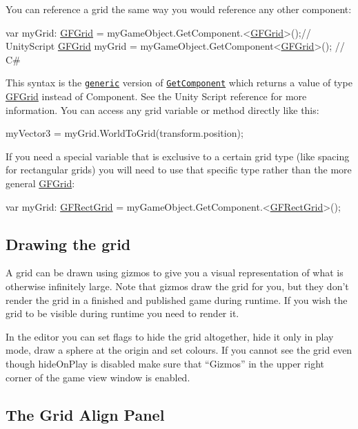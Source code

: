 You can reference a grid the same way you would reference any other component\+: 
\begin{DoxyCode}
var myGrid: \hyperlink{class_g_f_grid}{GFGrid} = myGameObject.GetComponent.<\hyperlink{class_g_f_grid}{GFGrid}>();\textcolor{comment}{// UnityScript}
\hyperlink{class_g_f_grid}{GFGrid} myGrid = myGameObject.GetComponent<\hyperlink{class_g_f_grid}{GFGrid}>();      \textcolor{comment}{// C#}
\end{DoxyCode}
 This syntax is the \href{http://docs.unity3d.com/Documentation/Manual/GenericFunctions.html}{\tt generic} version of \href{http://docs.unity3d.com/Documentation/ScriptReference/GameObject.GetComponent.html}{\tt Get\+Component} which returns a value of type \hyperlink{class_g_f_grid}{G\+F\+Grid} instead of Component. See the Unity Script reference for more information. You can access any grid variable or method directly like this\+: 
\begin{DoxyCode}
myVector3 = myGrid.WorldToGrid(transform.position);
\end{DoxyCode}
 If you need a special variable that is exclusive to a certain grid type (like {\ttfamily spacing} for rectangular grids) you will need to use that specific type rather than the more general {\ttfamily \hyperlink{class_g_f_grid}{G\+F\+Grid}}\+: 
\begin{DoxyCode}
var myGrid: \hyperlink{class_g_f_rect_grid}{GFRectGrid} = myGameObject.GetComponent.<\hyperlink{class_g_f_rect_grid}{GFRectGrid}>();
\end{DoxyCode}


\subsection*{Drawing the grid }

A grid can be drawn using gizmos to give you a visual representation of what is otherwise infinitely large. Note that gizmos draw the grid for you, but they don’t render the grid in a finished and published game during runtime. If you wish the grid to be visible during runtime you need to render it.

In the editor you can set flags to hide the grid altogether, hide it only in play mode, draw a sphere at the origin and set colours. If you cannot see the grid even though {\ttfamily hide\+On\+Play} is disabled make sure that “\+Gizmos” in the upper right corner of the game view window is enabled.

\subsection*{The Grid Align Panel }

